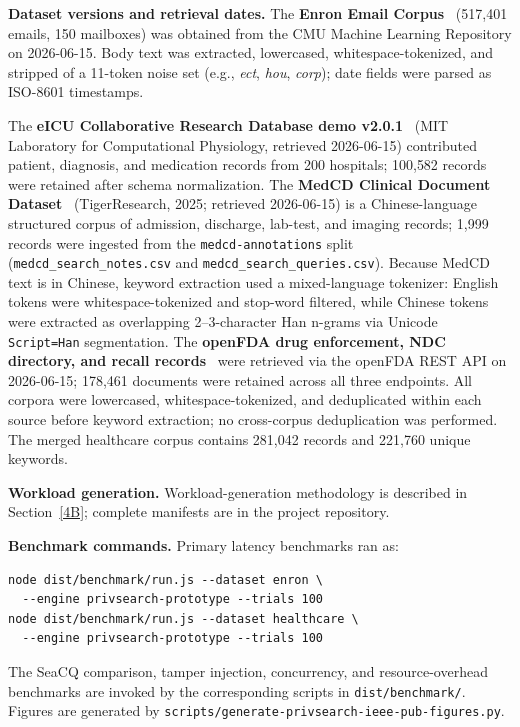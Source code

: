 \documentclass[journal]{IEEEtran}
\theoremstyle{tight}
\theoremstyle{remark}
\theoremstyle{plain}
\begin{document}
\textbf{Dataset versions and retrieval dates.}
The \textbf{Enron Email Corpus}~\cite{Klimt2004} (517{,}401 emails, 150 mailboxes) was obtained from the CMU Machine Learning Repository on 2026-06-15. Body text was extracted, lowercased, whitespace-tokenized, and stripped of a 11-token noise set (e.g., \textit{ect}, \textit{hou}, \textit{corp}); date fields were parsed as ISO-8601 timestamps.

The \textbf{eICU Collaborative Research Database demo v2.0.1}~\cite{Pollard2018eICU} (MIT Laboratory for Computational Physiology, retrieved 2026-06-15) contributed patient, diagnosis, and medication records from 200 hospitals; 100{,}582 records were retained after schema normalization. The \textbf{MedCD Clinical Document Dataset}~\cite{TigerResearch2025MedCD} (TigerResearch, 2025; retrieved 2026-06-15) is a Chinese-language structured corpus of admission, discharge, lab-test, and imaging records; 1{,}999 records were ingested from the \texttt{medcd-annotations} split (\texttt{medcd\_search\_notes.csv} and \texttt{medcd\_search\_queries.csv}). Because MedCD text is in Chinese, keyword extraction used a mixed-language tokenizer: English tokens were whitespace-tokenized and stop-word filtered, while Chinese tokens were extracted as overlapping 2--3-character Han n-grams via Unicode \texttt{Script=Han} segmentation. The \textbf{openFDA drug enforcement, NDC directory, and recall records}~\cite{openFDA} were retrieved via the openFDA REST API on 2026-06-15; 178{,}461 documents were retained across all three endpoints. All corpora were lowercased, whitespace-tokenized, and deduplicated within each source before keyword extraction; no cross-corpus deduplication was performed. The merged healthcare corpus contains 281{,}042 records and 221{,}760 unique keywords.

\textbf{Workload generation.}
Workload-generation methodology is described in Section~\ref{4B}; complete manifests are in the project repository.

\textbf{Benchmark commands.}
Primary latency benchmarks ran as:
\begin{verbatim}
node dist/benchmark/run.js --dataset enron \
  --engine privsearch-prototype --trials 100
node dist/benchmark/run.js --dataset healthcare \
  --engine privsearch-prototype --trials 100
\end{verbatim}
The SeaCQ comparison, tamper injection, concurrency, and resource-overhead benchmarks are invoked by the corresponding scripts in \texttt{dist/benchmark/}. Figures are generated by \texttt{scripts/generate-privsearch-ieee-pub-figures.py}.
\end{document}
